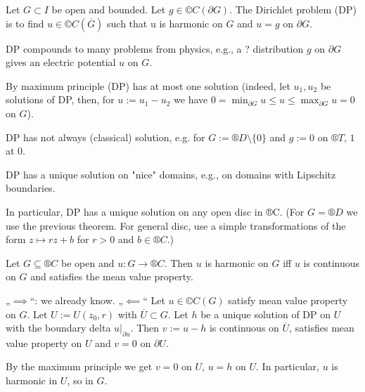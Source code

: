 \documentclass[12pt]{article}					%
\begin{document}
\begin{definice}
	Let $G \subset I$ be open and bounded. Let $g \in ©C(\partial G)$. The Dirichlet problem (DP) is to find $u \in ©C(\overline{G})$ such that u is harmonic on $G$ and $u = g$ on $\partial G$.

	\begin{poznamkain}
		DP compounds to many problems from physics, e.g., a ? distribution $g$ on $\partial G$ gives an electric potential $u$ on $G$.

		By maximum principle (DP) has at most one solution (indeed, let $u_1, u_2$ be solutions of DP, then, for $u := u_1 - u_2$ we have $0 = \min_{\partial G} u ≤ u ≤ \max_{\partial G} u = 0$ on $G$).

		DP has not always (classical) solution, e.g. for $G := ®D \setminus \{0\}$ and $g:=0$ on $®T$, $1$ at $0$.

		DP has a unique solution on "nice" domains, e.g., on domains with Lipschitz boundaries.

		In particular, DP has a unique solution on any open disc in ®C. (For $G = ®D$ we use the previous theorem. For general disc, use a simple transformations of the form $z \mapsto rz + b$ for $r > 0$ and $b \in ®C$.)
	\end{poznamkain}
\end{definice}

\begin{veta}
	Let $G \subseteq ®C$ be open and $u: G \rightarrow ®C$. Then $u$ is harmonic on $G$ iff $u$ is continuous on $G$ and satisfies the mean value property.

	\begin{dukazin}
		„$\implies$“: we already know. „$\impliedby$“ Let $u \in ©C(G)$ satisfy mean value property on $G$. Let $U := U(z_0, r)$ with $\overline{U} \subset G$. Let $h$ be a unique solution of DP on $U$ with the boundary delta $u|_{\partial u}$. Then $v := u - h$ is continuous on $\overline{U}$, satisfies mean value property on $U$ and $v = 0$ on $\partial U$.

		By the maximum principle we get $v = 0$ on $U$, $u = h$ on $U$. In particular, $u$ is harmonic in $U$, so in $G$.
	\end{dukazin}
\end{veta}
\end{document}
